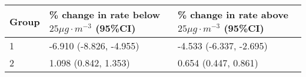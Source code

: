 \begin{tabular}{lll}
  \hline
Group & \% change in rate below $25 \mu g \cdot m^{-3}$ (95\%CI) & \% change in rate above $25 \mu g \cdot m^{-3}$ (95\%CI) \\ 
  \hline
   1 & -6.910 (-8.826, -4.955) & -4.533 (-6.337, -2.695) \\ 
     2 & 1.098 (0.842, 1.353) & 0.654 (0.447, 0.861) \\ 
   \hline
\end{tabular}


